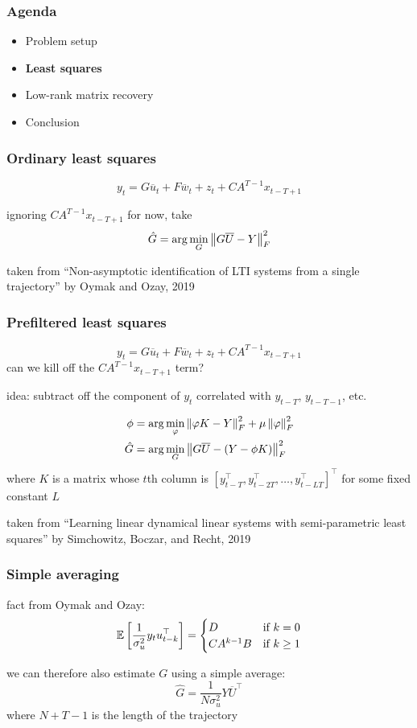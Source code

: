 \begin{frame}
\frametitle{Agenda}
\begin{itemize}
\item Problem setup
\item \textbf{Least squares}
\item Low-rank matrix recovery
\item Conclusion
\end{itemize}
\end{frame}

\begin{frame}
\frametitle{Ordinary least squares}
\[ y_t = G \overline{u}_t + F \overline{w}_t + z_t + C A^{T-1} x_{t-T+1} \]

ignoring $C A^{T-1} x_{t-T+1}$ for now, take
\[ \hat G = \arg\min_G \left\Vert{G \overline{U} - Y}\right\Vert_F^2 \]

taken from
``Non-asymptotic identification of LTI systems from a single trajectory''
by Oymak and Ozay, 2019
\end{frame}

\begin{frame}
\frametitle{Prefiltered least squares}
\[ y_t = G \overline{u}_t + F \overline{w}_t + z_t + C A^{T-1} x_{t-T+1} \]
can we kill off the $C A^{T-1} x_{t-T+1}$ term?

idea: subtract off the component of $y_t$ correlated with $y_{t-T}$, $y_{t-T-1}$, etc.

\begin{align*}
\phi &= \arg\min_\varphi \left\Vert{\varphi K - Y}\right\Vert_F^2 + \mu \left\Vert{\varphi}\right\Vert_F^2 \\
\hat G &= \arg\min_G \left\Vert{G \overline{U} - (Y - \phi K)}\right\Vert_F^2
\end{align*}
where $K$ is a matrix whose $t$th column is
$[y_{t-T}^\top, y_{t-2T}^\top, \ldots, y_{t-LT}^\top]^\top$
for some fixed constant $L$

taken from
``Learning linear dynamical linear systems with semi-parametric least squares''
by Simchowitz, Boczar, and Recht, 2019
\end{frame}

\begin{frame}
\frametitle{Simple averaging}
fact from Oymak and Ozay:
\[
\operatorname*{\mathbb{E}}_{}\left\lbrack{\frac{1}{\sigma_u^2} y_t u_{t-k}^\top}\right\rbrack = \begin{cases}
D & \text{if } k = 0 \\
C A^{k-1} B & \text{if } k \ge 1 \\
\end{cases}
\]

we can therefore also estimate $G$ using a simple average:
\[ \hat G = \frac{1}{N \sigma_u^2} Y \overline{U}^\top \]
where $N + T - 1$ is the length of the trajectory
\end{frame}

